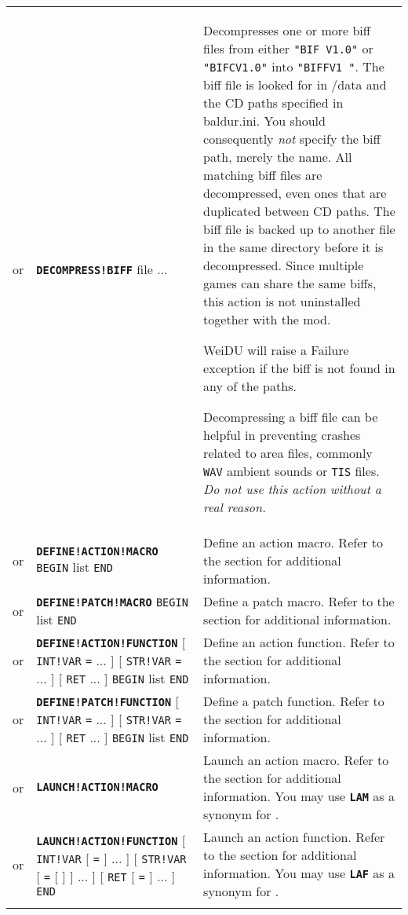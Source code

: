 \documentclass{article}
\def\ttref#1{\ahrefloc{#1}{\tt #1}}
\def\DEFINE#1{{\tt \bf #1}\label{#1}\index{#1}}
\def\t#1{{\tt #1}}
\def\Slist{{\color{red} list }}
\def\Ob{{\color{red} [ }}
\def\Oe{{\color{red} ] }}
\begin{document}
\begin{tabular}{cp{10in}|p{10in}}
or & \DEFINE{DECOMPRESS!BIFF} file ... &
  Decompresses one or more biff files from either \t{"BIF V1.0"} or \t{"BIFCV1.0"}
  into \t{"BIFFV1  "}.
  The biff file is looked for in /data and the CD paths specified in baldur.ini. You should
  consequently \emph{not} specify the biff path, merely the name. All matching biff files
  are decompressed, even ones that are duplicated between CD paths. The biff file is backed up
  to another file in the same directory before it is decompressed. Since multiple games
  can share the same biffs, this action is not uninstalled together with the mod.

  WeiDU will raise a Failure exception if the biff is not found in any of the paths.

  Decompressing a biff file can be helpful in preventing crashes related to area files,
  commonly \t{WAV} ambient sounds or \t{TIS} files. \emph{Do not use this action without a real reason.} \\

or & \DEFINE{DEFINE!ACTION!MACRO} \ttref{String} \t{BEGIN}
     \ttref{TP2 Action} \Slist \t{END} &
  Define an action macro. Refer to the \ttref{macros} section for
  additional information. \\
or & \DEFINE{DEFINE!PATCH!MACRO} \ttref{String} \t{BEGIN}
     \ttref{patch} \Slist \t{END} &
  Define a patch macro. Refer to the \ttref{macros} section for
  additional information. \\
or & \DEFINE{DEFINE!ACTION!FUNCTION} \ttref{String}
     \Ob \t{INT!VAR} \ttref{variable} \t{=} \ttref{value} ... \Oe
     \Ob \t{STR!VAR} \ttref{variable} \t{=} \ttref{String} ... \Oe
     \Ob \t{RET} \ttref{variable} ... \Oe \t{BEGIN} \ttref{TP2 Action} \Slist
     \t{END} &
  Define an action function. Refer to the \ttref{Functions} section for
  additional information. \\
or & \DEFINE{DEFINE!PATCH!FUNCTION} \ttref{String}
     \Ob \t{INT!VAR} \ttref{variable} \t{=} \ttref{value} ... \Oe
     \Ob \t{STR!VAR} \ttref{variable} \t{=} \ttref{String} ... \Oe
     \Ob \t{RET} \ttref{variable} ... \Oe \t{BEGIN} \ttref{patch} \Slist
     \t{END} &
  Define a patch function. Refer to the \ttref{Functions} section for
  additional information. \\
or & \DEFINE{LAUNCH!ACTION!MACRO} \ttref{String} &
  Launch an action macro. Refer to the \ttref{macros} section for
  additional information. You may use \DEFINE{LAM} as a synonym for
  \ttref{LAUNCH!ACTION!MACRO}.\\
or & \DEFINE{LAUNCH!ACTION!FUNCTION} \ttref{String}
     \Ob \t{INT!VAR} \ttref{variable} \Ob \t{=} \ttref{value} \Oe ... \Oe
     \Ob \t{STR!VAR} \ttref{variable} \Ob \t{=} \Ob \ttref{EVALUATE!BUFFER}
     \Oe \ttref{String} \Oe ... \Oe
     \Ob \t{RET} \ttref{variable} \Ob \t{=} \ttref{String} \Oe ... \Oe
     \t{END} &
  Launch an action function. Refer to the \ttref{Functions} section for
  additional information. You may use \DEFINE{LAF} as a synonym for
  \ttref{LAUNCH!ACTION!FUNCTION}.\\
\\


\end{tabular}
\end{document}

